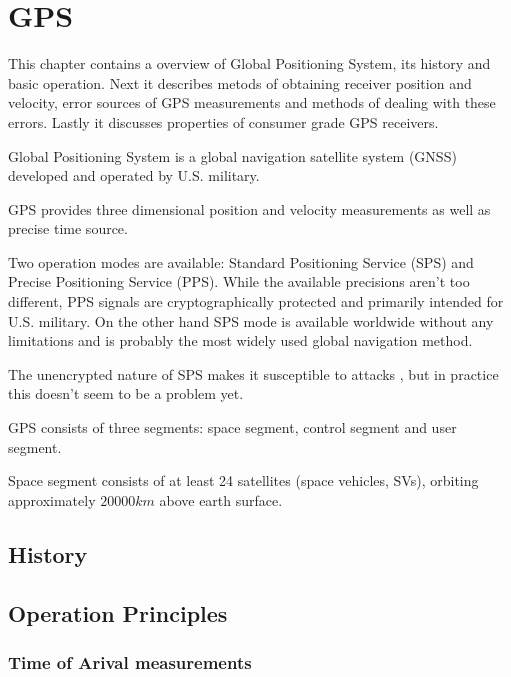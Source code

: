 \chapter{GPS}
\label{chap:gps}

This chapter contains a overview of Global Positioning System,
its history and basic operation.
Next it describes metods of obtaining receiver position and velocity,
error sources of GPS measurements and methods of dealing with these errors.
Lastly it discusses properties of consumer grade GPS receivers.

Global Positioning System is a global navigation satellite system (GNSS)
developed and operated by U.S. military.



GPS provides three dimensional position and velocity measurements as well as
precise time source.

Two operation modes are available: Standard Positioning Service (SPS) and
Precise Positioning Service (PPS).
While the available precisions aren't too different, PPS signals are
cryptographically protected and primarily intended for U.S. military.
On the other hand SPS mode is available worldwide without any limitations
and is probably the most widely used global navigation method.

The unencrypted nature of SPS makes it susceptible to attacks
\cite{tippenhauer11}, but in practice this doesn't seem to be a problem yet.


GPS consists of three segments: space segment, control segment and user segment.

Space segment consists of at least 24 satellites (space vehicles, SVs), orbiting
approximately \(20000 km\) above earth surface.
%
\section{History}
%
\section{Operation Principles}
%
\subsection{Time of Arival measurements}

%
%
%
%
%
